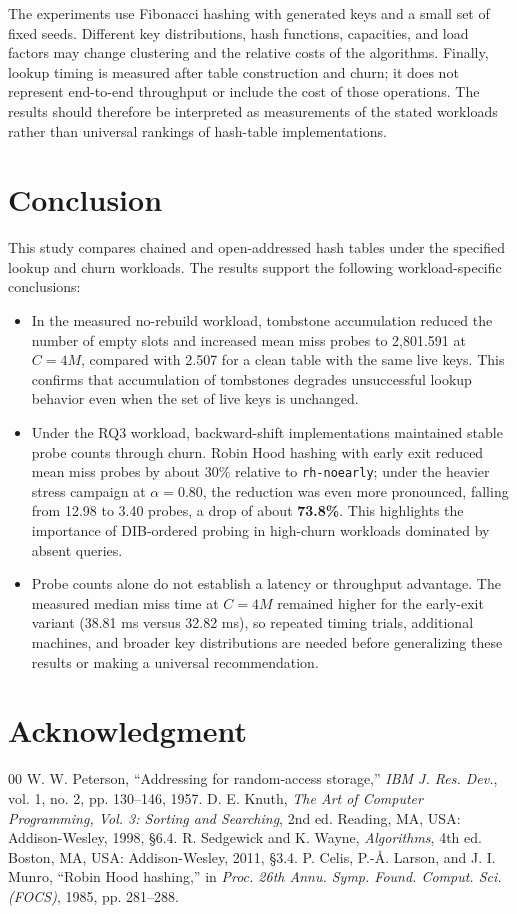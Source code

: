 \documentclass[conference]{IEEEtran}
\begin{document}
The experiments use Fibonacci hashing with generated keys and a small set of
fixed seeds. Different key distributions, hash functions, capacities, and
load factors may change clustering and the relative costs of the algorithms.
Finally, lookup timing is measured after table construction and churn; it does
not represent end-to-end throughput or include the cost of those operations.
The results should therefore be interpreted as measurements of the stated
workloads rather than universal rankings of hash-table implementations.

\section{Conclusion}
This study compares chained and open-addressed hash tables under the
specified lookup and churn workloads. The results support the following
workload-specific conclusions:
\begin{itemize}
    \item In the measured no-rebuild workload, tombstone accumulation reduced the number of empty slots and increased mean miss probes to 2,801.591 at $C=4M$, compared with 2.507 for a clean table with the same live keys. This confirms that accumulation of tombstones degrades unsuccessful lookup behavior even when the set of live keys is unchanged.
    \item Under the RQ3 workload, backward-shift implementations maintained stable probe counts through churn. Robin Hood hashing with early exit reduced mean miss probes by about $30\%$ relative to \texttt{rh-noearly}; under the heavier stress campaign at $\alpha = 0.80$, the reduction was even more pronounced, falling from 12.98 to 3.40 probes, a drop of about \textbf{73.8\%}. This highlights the importance of DIB-ordered probing in high-churn workloads dominated by absent queries.
    \item Probe counts alone do not establish a latency or throughput advantage. The measured median miss time at $C=4M$ remained higher for the early-exit variant (38.81 ms versus 32.82 ms), so repeated timing trials, additional machines, and broader key distributions are needed before generalizing these results or making a universal recommendation.
\end{itemize}

\section*{Acknowledgment}

\begin{thebibliography}{00}
 W. W. Peterson, ``Addressing for random-access storage,'' \textit{IBM J. Res. Dev.}, vol. 1, no. 2, pp. 130--146, 1957.
 D. E. Knuth, \textit{The Art of Computer Programming, Vol. 3: Sorting and Searching}, 2nd ed. Reading, MA, USA: Addison-Wesley, 1998, \S6.4.
 R. Sedgewick and K. Wayne, \textit{Algorithms}, 4th ed. Boston, MA, USA: Addison-Wesley, 2011, \S3.4.
 P. Celis, P.-\AA. Larson, and J. I. Munro, ``Robin Hood hashing,'' in \textit{Proc. 26th Annu. Symp. Found. Comput. Sci. (FOCS)}, 1985, pp. 281--288.
\end{thebibliography}
\end{document}

